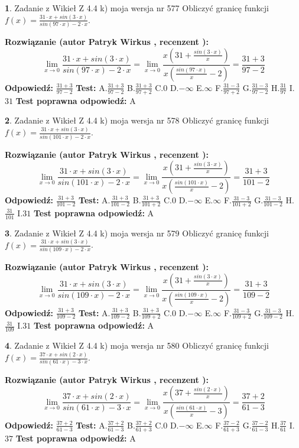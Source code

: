 \documentclass[12pt, a4paper]{article}
\theoremstyle{definition} %
\newtheorem{zad}{}
\newcommand{\zadStart}[1]{\begin{zad}#1\newline}
\newcommand{\zadStop}{\end{zad}}
\newcommand{\rozwStart}[2]{\noindent \textbf{Rozwiązanie (autor #1 , recenzent #2): }\newline}
\newcommand{\rozwStop}{\newline}
\newcommand{\odpStart}{\noindent \textbf{Odpowiedź:}\newline}
\newcommand{\odpStop}{\newline}
\newcommand{\testStart}{\noindent \textbf{Test:}\newline}
\newcommand{\testStop}{\newline}
\newcommand{\kluczStart}{\noindent \textbf{Test poprawna odpowiedź:}\newline}
\newcommand{\kluczStop}{\newline}
\begin{document}
\zadStart{Zadanie z Wikieł Z 4.4 k) moja wersja nr 577}
Obliczyć granicę funkcji $f(x)=\frac{31\cdot x +sin(3\cdot x)}{sin(97\cdot x) -2\cdot x}$.
\zadStop
\rozwStart{Patryk Wirkus}{}
$$\lim\limits_{x\to 0}\frac{31\cdot x +sin(3\cdot x)}{sin(97\cdot x) -2\cdot x}
=\lim\limits_{x\to 0}\frac{x(31+\frac{sin(3\cdot x)}{x})}{x(\frac{sin(97\cdot x)}{x}-2)}
=\frac{31+3}{97-2}$$
\rozwStop
\odpStart
$\frac{31+3}{97-2}$
\odpStop
\testStart
A.$\frac{31+3}{97-2}$
B.$\frac{31+3}{97+2}$
C.$0$
D.$-\infty$
E.$\infty$
F.$\frac{31-3}{97+2}$
G.$\frac{31-3}{97-2}$
H.$\frac{31}{97}$
I.$31$
\testStop
\kluczStart
A
\kluczStop



\zadStart{Zadanie z Wikieł Z 4.4 k) moja wersja nr 578}
Obliczyć granicę funkcji $f(x)=\frac{31\cdot x +sin(3\cdot x)}{sin(101\cdot x) -2\cdot x}$.
\zadStop
\rozwStart{Patryk Wirkus}{}
$$\lim\limits_{x\to 0}\frac{31\cdot x +sin(3\cdot x)}{sin(101\cdot x) -2\cdot x}
=\lim\limits_{x\to 0}\frac{x(31+\frac{sin(3\cdot x)}{x})}{x(\frac{sin(101\cdot x)}{x}-2)}
=\frac{31+3}{101-2}$$
\rozwStop
\odpStart
$\frac{31+3}{101-2}$
\odpStop
\testStart
A.$\frac{31+3}{101-2}$
B.$\frac{31+3}{101+2}$
C.$0$
D.$-\infty$
E.$\infty$
F.$\frac{31-3}{101+2}$
G.$\frac{31-3}{101-2}$
H.$\frac{31}{101}$
I.$31$
\testStop
\kluczStart
A
\kluczStop



\zadStart{Zadanie z Wikieł Z 4.4 k) moja wersja nr 579}
Obliczyć granicę funkcji $f(x)=\frac{31\cdot x +sin(3\cdot x)}{sin(109\cdot x) -2\cdot x}$.
\zadStop
\rozwStart{Patryk Wirkus}{}
$$\lim\limits_{x\to 0}\frac{31\cdot x +sin(3\cdot x)}{sin(109\cdot x) -2\cdot x}
=\lim\limits_{x\to 0}\frac{x(31+\frac{sin(3\cdot x)}{x})}{x(\frac{sin(109\cdot x)}{x}-2)}
=\frac{31+3}{109-2}$$
\rozwStop
\odpStart
$\frac{31+3}{109-2}$
\odpStop
\testStart
A.$\frac{31+3}{109-2}$
B.$\frac{31+3}{109+2}$
C.$0$
D.$-\infty$
E.$\infty$
F.$\frac{31-3}{109+2}$
G.$\frac{31-3}{109-2}$
H.$\frac{31}{109}$
I.$31$
\testStop
\kluczStart
A
\kluczStop



\zadStart{Zadanie z Wikieł Z 4.4 k) moja wersja nr 580}
Obliczyć granicę funkcji $f(x)=\frac{37\cdot x +sin(2\cdot x)}{sin(61\cdot x) -3\cdot x}$.
\zadStop
\rozwStart{Patryk Wirkus}{}
$$\lim\limits_{x\to 0}\frac{37\cdot x +sin(2\cdot x)}{sin(61\cdot x) -3\cdot x}
=\lim\limits_{x\to 0}\frac{x(37+\frac{sin(2\cdot x)}{x})}{x(\frac{sin(61\cdot x)}{x}-3)}
=\frac{37+2}{61-3}$$
\rozwStop
\odpStart
$\frac{37+2}{61-3}$
\odpStop
\testStart
A.$\frac{37+2}{61-3}$
B.$\frac{37+2}{61+3}$
C.$0$
D.$-\infty$
E.$\infty$
F.$\frac{37-2}{61+3}$
G.$\frac{37-2}{61-3}$
H.$\frac{37}{61}$
I.$37$
\testStop
\kluczStart
A
\kluczStop
\end{document}

